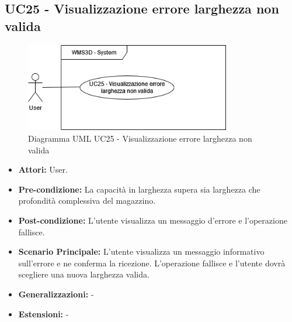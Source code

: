 \subsection{UC25 - Visualizzazione errore larghezza non valida}
\begin{figure}[H]
  \centering
  \includegraphics[width=0.8\textwidth]{UC_diagrams_21-27/UC25.drawio.png}
   \caption{Diagramma UML UC25 - Visualizzazione errore larghezza non valida}
\end{figure}
\begin{itemize}
    \item \textbf{Attori:} User.
    \item \textbf{Pre-condizione:}  La capacità in larghezza supera sia larghezza che profondità complessiva del magazzino.
    \item \textbf{Post-condizione:} L'utente visualizza un messaggio d'errore e l'operazione fallisce.
    \item \textbf{Scenario Principale:}  L'utente visualizza un messaggio informativo sull'errore e ne conferma la ricezione. L'operazione fallisce e l'utente dovrà scegliere una nuova larghezza valida.
    \item \textbf{Generalizzazioni:} -
    \item \textbf{Estensioni:} -
\end{itemize}